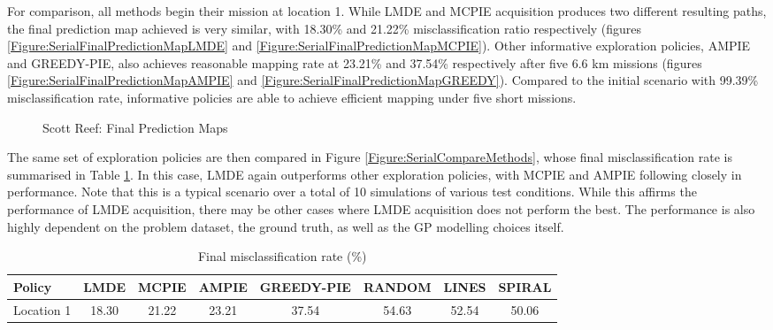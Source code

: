 			For comparison, all methods begin their mission at location 1. While LMDE and MCPIE acquisition produces two different resulting paths, the final prediction map achieved is very similar, with 18.30\% and 21.22\% misclassification ratio respectively (figures \ref{Figure:SerialFinalPredictionMapLMDE} and \ref{Figure:SerialFinalPredictionMapMCPIE}). Other informative exploration policies, AMPIE and GREEDY-PIE, also achieves reasonable mapping rate at 23.21\% and 37.54\% respectively after five 6.6 km missions (figures \ref{Figure:SerialFinalPredictionMapAMPIE} and \ref{Figure:SerialFinalPredictionMapGREEDY}). Compared to the initial scenario with 99.39\% misclassification rate, informative policies are able to achieve efficient mapping under five short missions.
			
			\begin{figure}[!htbp]
			\centering
			\caption{Scott Reef: Final Prediction Maps}
			\label{Figure:SerialFinalPredictionMap}
			\end{figure}
			
			The same set of exploration policies are then compared in Figure \ref{Figure:SerialCompareMethods}, whose final misclassification rate is summarised in Table \ref{Table:SerialCompareMethods}. In this case, LMDE again outperforms other exploration policies, with MCPIE and AMPIE following closely in performance. Note that this is a typical scenario over a total of 10 simulations of various test conditions. While this affirms the performance of LMDE acquisition, there may be other cases where LMDE acquisition does not perform the best. The performance is also highly dependent on the problem dataset, the ground truth, as well as the GP modelling choices itself. 

			\begin{table}[t]
				{\footnotesize
				\begin{center}
					\begin{tabular}{ l c c c c c c c }
					\hline
					Policy & LMDE & MCPIE & AMPIE & GREEDY-PIE & RANDOM & LINES & SPIRAL \\
					\hline
					Location 1 & 18.30 & 21.22 & 23.21 & 37.54 & 54.63 & 52.54 & 50.06 \\
					\hline
					\end{tabular}
				\end{center}
				}
		  	\caption{Final misclassification rate (\%)}
		  	\label{Table:SerialCompareMethods}
		  	\end{table}	
		  				
